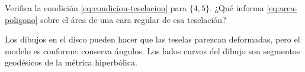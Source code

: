 \begin{exercise}
Verifica la condición \cref{eq:condicion-teselacion} para \(\{4,5\}\). ¿Qué informa \cref{eq:area-poligono} sobre el área de una cara regular de esa teselación?
\end{exercise}

\begin{remark}
Los dibujos en el disco pueden hacer que las teselas parezcan deformadas, pero el modelo es conforme: conserva ángulos. Los lados curvos del dibujo son segmentos geodésicos de la métrica hiperbólica.
\end{remark}
